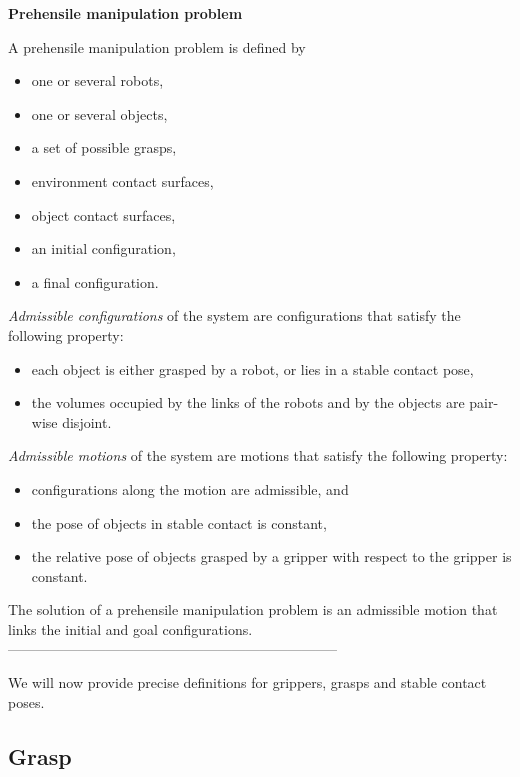 \begin{definition}\label{def:manipulation-problem}\textbf{Prehensile manipulation problem}
  
  \noindent A prehensile manipulation problem is defined by
  \begin{itemize}
  \item one or several robots,
  \item one or several objects,
  \item a set of possible grasps,
  \item environment contact surfaces,
  \item object contact surfaces,
  \item an initial configuration,
  \item a final configuration.
  \end{itemize}
  \textit{Admissible configurations} of the system are configurations that satisfy the following property:
  \begin{itemize}
  \item each object is either grasped by a robot, or lies in a stable contact pose,
  \item {\color{blue} the volumes occupied by the links of the robots and by
    the objects are pair-wise disjoint.}
  \end{itemize}
  \textit{Admissible motions} of the system are motions that satisfy the following property:
  \begin{itemize}
  \item configurations along the motion are admissible, and
  \item the pose of objects in stable contact is constant,
  \item the relative pose of objects grasped by a gripper with respect to the gripper is constant.
  \end{itemize}
  The solution of a prehensile manipulation problem is an admissible motion that
  links the initial and goal configurations.\\
  -----------------------------------------------------------------------
\end{definition}
We will now provide precise definitions for grippers, grasps and stable contact poses.

\subsection{Grasp}\label{subsec:grasp}

